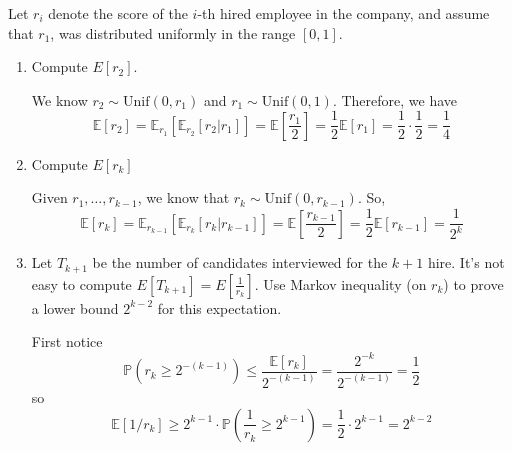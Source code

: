 \documentclass[12pt,letterpaper]{article}
\renewcommand{\P}{\mathbb{P}}
\newcommand{\E}{\mathbb{E}}
\begin{document}
Let $r_i$ denote the score of the $i$-th hired employee in the company, and assume that  $r_1$, was distributed uniformly in the range $[0,1]$.
\begin{enumerate}
\item Compute $E[r_2]$.

\color{darkblue}
    We know $r_2 \sim \text{Unif}(0, r_1)$ and $r_1 \sim \text{Unif}(0, 1)$. Therefore, we have
    \[ \E[r_2] = \E_{r_1}[\E_{r_2}[r_2 | r_1]] = \E\left[\frac{r_1}{2}\right] = \frac{1}{2}\E[r_1] = \frac{1}{2}\cdot\frac{1}{2} = \frac{1}{4}\]
\color{black}

\item Compute $E[r_k]$

\color{darkblue}
    Given $r_1, \dots, r_{k-1}$, we know that $r_k \sim \text{Unif}(0, r_{k-1})$. So,
    \[\E[r_k] = \E_{r_{k-1}}[\E_{r_k}[r_k | r_{k-1}]] = \E\left[\frac{r_{k-1}}{2}\right] = \frac{1}{2}\E[r_{k-1}] = \frac{1}{2^k}\]
\color{black}

\item Let $T_{k+1}$ be the number of candidates interviewed for the $k+1$ hire.
It's not easy to compute $E[T_{k+1}]=E[\frac{1}{r_k}]$. Use Markov inequality (on $r_k$) to prove a lower bound $2^{k-2}$ for this expectation.

\color{darkblue}
    First notice 
    \[\P(r_k \geq 2^{-(k-1)}) \leq \frac{\E[r_k]}{2^{-(k-1)}} = \frac{2^{-k}}{2^{-(k-1)}} = \frac{1}{2}\]
    so 
    \[\E[1/r_k] \geq 2^{k-1} \cdot \P\left(\frac{1}{r_k}\geq 2^{k-1}\right)= \frac{1}{2} \cdot 2^{k-1} = 2^{k-2}\]

\color{black}



\end{enumerate}
\end{document}
